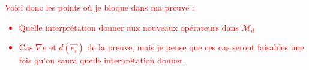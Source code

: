 \documentclass[12pt]{article}
\newcommand{\FOL}{\ensuremath{\textup{\tiny{}FOL}}}
\newcommand{\M}{\ensuremath{\mathcal{M}}}
\newcommand{\raph}[1]{\textcolor{red}{#1}}
\begin{document}
\raph{%
  Voici donc les points où je bloque dans ma preuve :
  \begin{itemize}
  \item
    Quelle interprétation donner aux nouveaux opérateurs dans $\mathcal{M}_d$
  \item
    Cas $\nabla e$ et $d(\vec{e_i})$ de la preuve, mais je pense que ces cas seront faisables une fois qu'on saura quelle interprétation donner.
  \end{itemize}}

\begin{comment}
  
\paragraph{Interprétation des nouveaux opérateurs dans $\mathcal{M}_d$}
On peut définir :
\begin{itemize}
\item
  Pour tout opérateur $d(\vec{x_i}) = e_d$ son interprétation dans $\mathcal{M}_d$ une fois abstrait :
  \[
    \mathcal{I}_d(\framebox{$d_{\vec{\epsilon}}$}) : \vec{a_i} \in \textup{ dom } \mathcal{M}_d \mapsto
    \llbracket {e_d}_\FOL^{\vec{x_i}} \rrbracket_{\mathcal{M}_d[x_i \mapsto a_i]}
  \]
  On évalue la définition, en affectant à chaque paramètre l'argument correspondant.

  \raph{Remarque sur cette définition :}
  
  Ceci permet ensuite dans la preuve pour le cas $d(\vec{e_i})$ :
  \[
    \llbracket d(\vec{e_i})_\FOL^y \rrbracket_{\mathcal{M}_d} =
    \llbracket {e_d}_\FOL^{\vec{x_i}} \rrbracket_{\mathcal{M}_d[x_i \mapsto \llbracket {e_i}_\FOL^y \rrbracket_{\mathcal{M}_d} ]} =
    \llbracket {e_d}_\FOL^{\vec{x_i}} ({e_i}_\FOL^y/{x_i}) \rrbracket_{\mathcal{M}_d}
  \]
  La première égalité est vraie par définition.\\
  On peut montrer la seconde égalité en utilisant d'un lemme de substitution en FOL.\\
  On devra ensuite montrer que : \raph{ Je bloque ici }
  \[
    \llbracket {e_d}_\FOL^{\vec{x_i}} ({e_i}_\FOL^y/{x_i}) \rrbracket_{\mathcal{M}_d} =
    \llbracket {e_d(e_i/x_i)_\FOL^y} \rrbracket_{\mathcal{M}_d}
  \]
  \raph{Ceci est vrai seulement si on choisit des bonnes interprétations dans $\M_d$ des opérateurs générés pendant l'abstraction de $\phi$.}


\end{comment}
\end{document}
